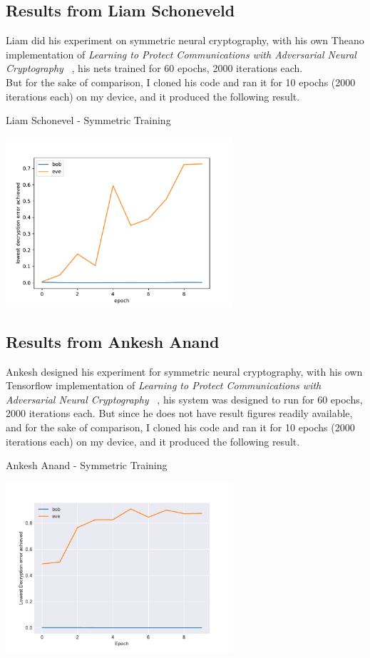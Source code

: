 \documentclass[a4paper, 12pt]{report}
\begin{document}
\subsection{\textbf{Results from Liam Schoneveld}~\citep{nlml/adversarial-neural-cryptography}}
Liam did his experiment on symmetric neural cryptography, with his own Theano implementation of \textit{Learning to Protect Communications with Adversarial Neural Cryptography} ~\citep{DBLP:journals/corr/AbadiA16}, his nets trained for 60 epochs, 2000 iterations each.\\
But for the sake of comparison, I cloned his code and ran it for 10 epochs (2000 iterations each) on my device, and it produced the following result.
\begin{blockfigure}{Liam Schonevel - Symmetric Training}
	\begin{center}
		\includegraphics[width = 0.63\textwidth]{nlml_results_conv}
	\end{center}
\end{blockfigure}
\subsection{\textbf{Results from Ankesh Anand}~\citep{ankeshanand/neural-cryptography-tensorflow}}
Ankesh designed his experiment for symmetric neural cryptography, with his own Tensorflow implementation of \textit{Learning to Protect Communications with Adversarial Neural Cryptography} ~\citep{DBLP:journals/corr/AbadiA16}, his system was designed to run for 60 epochs, 2000 iterations each.
But since he does not have result figures readily available, and for the sake of comparison, I cloned his code and ran it for 10 epochs (2000 iterations each) on my device, and it produced the following result.
\begin{blockfigure}{Ankesh Anand - Symmetric Training}
	\begin{center}
		\includegraphics[width = 0.63\textwidth]{ankesh_results_conv}
	\end{center}
\end{blockfigure}
\newpage
\end{document}
